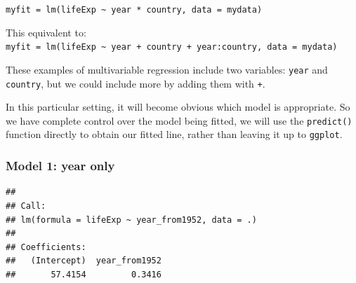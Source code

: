 \documentclass[12pt,]{krantz}
\makeatletter
\newenvironment{Shaded}{\begin{snugshade}}{\end{snugshade}}
\newcommand{\DataTypeTok}[1]{\textcolor[rgb]{0.13,0.29,0.53}{#1}}
\newcommand{\KeywordTok}[1]{\textcolor[rgb]{0.13,0.29,0.53}{\textbf{#1}}}
\newcommand{\NormalTok}[1]{#1}
\newcommand{\OperatorTok}[1]{\textcolor[rgb]{0.81,0.36,0.00}{\textbf{#1}}}
\newcommand{\StringTok}[1]{\textcolor[rgb]{0.31,0.60,0.02}{#1}}
\newenvironment{kframe}{%
\medskip{}
\setlength{\fboxsep}{.8em}
 \def\at@end@of@kframe{}%
 \ifinner\ifhmode%
  \def\at@end@of@kframe{\end{minipage}}%
  \begin{minipage}{\columnwidth}%
 \fi\fi%
 \def\FrameCommand##1{\hskip\@totalleftmargin \hskip-\fboxsep
 \colorbox{shadecolor}{##1}\hskip-\fboxsep
     \hskip-\linewidth \hskip-\@totalleftmargin \hskip\columnwidth}%
 \MakeFramed {\advance\hsize-\width
   \@totalleftmargin\z@ \linewidth\hsize
   \@setminipage}}%
 {\par\unskip\endMakeFramed%
 \at@end@of@kframe}
\renewenvironment{Shaded}{\begin{kframe}}{\end{kframe}}
\theoremstyle{definition}
\theoremstyle{definition}
\theoremstyle{definition}
\theoremstyle{remark}
\makeatother
\begin{document}
\texttt{myfit\ =\ lm(lifeExp\ \textasciitilde{}\ year\ *\ country,\ data\ =\ mydata)}

This equivalent to:
\texttt{myfit\ =\ lm(lifeExp\ \textasciitilde{}\ year\ +\ country\ +\ year:country,\ data\ =\ mydata)}

These examples of multivariable regression include two variables:
\texttt{year} and \texttt{country}, but we could include more by adding
them with \texttt{+}.

In this particular setting, it will become obvious which model is
appropriate. So we have complete control over the model being fitted, we
will use the \texttt{predict()} function directly to obtain our fitted
line, rather than leaving it up to \texttt{ggplot}.

\hypertarget{model-1-year-only}{%
\subsubsection{Model 1: year only}\label{model-1-year-only}}

\begin{Shaded}
\end{Shaded}

\begin{verbatim}
## 
## Call:
## lm(formula = lifeExp ~ year_from1952, data = .)
## 
## Coefficients:
##   (Intercept)  year_from1952  
##       57.4154         0.3416
\end{verbatim}

\begin{Shaded}
\end{Shaded}
\end{document}
